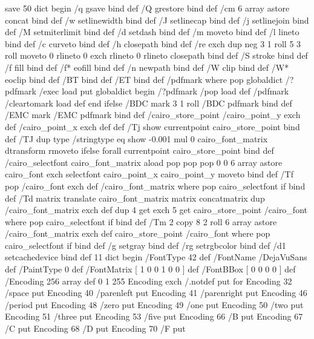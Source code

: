 save
50 dict begin
/q { gsave } bind def
/Q { grestore } bind def
/cm { 6 array astore concat } bind def
/w { setlinewidth } bind def
/J { setlinecap } bind def
/j { setlinejoin } bind def
/M { setmiterlimit } bind def
/d { setdash } bind def
/m { moveto } bind def
/l { lineto } bind def
/c { curveto } bind def
/h { closepath } bind def
/re { exch dup neg 3 1 roll 5 3 roll moveto 0 rlineto
      0 exch rlineto 0 rlineto closepath } bind def
/S { stroke } bind def
/f { fill } bind def
/f* { eofill } bind def
/n { newpath } bind def
/W { clip } bind def
/W* { eoclip } bind def
/BT { } bind def
/ET { } bind def
/pdfmark where { pop globaldict /?pdfmark /exec load put }
    { globaldict begin /?pdfmark /pop load def /pdfmark
    /cleartomark load def end } ifelse
/BDC { mark 3 1 roll /BDC pdfmark } bind def
/EMC { mark /EMC pdfmark } bind def
/cairo_store_point { /cairo_point_y exch def /cairo_point_x exch def } def
/Tj { show currentpoint cairo_store_point } bind def
/TJ {
  {
    dup
    type /stringtype eq
    { show } { -0.001 mul 0 cairo_font_matrix dtransform rmoveto } ifelse
  } forall
  currentpoint cairo_store_point
} bind def
/cairo_selectfont { cairo_font_matrix aload pop pop pop 0 0 6 array astore
    cairo_font exch selectfont cairo_point_x cairo_point_y moveto } bind def
/Tf { pop /cairo_font exch def /cairo_font_matrix where
      { pop cairo_selectfont } if } bind def
/Td { matrix translate cairo_font_matrix matrix concatmatrix dup
      /cairo_font_matrix exch def dup 4 get exch 5 get cairo_store_point
      /cairo_font where { pop cairo_selectfont } if } bind def
/Tm { 2 copy 8 2 roll 6 array astore /cairo_font_matrix exch def
      cairo_store_point /cairo_font where { pop cairo_selectfont } if } bind def
/g { setgray } bind def
/rg { setrgbcolor } bind def
/d1 { setcachedevice } bind def
11 dict begin
/FontType 42 def
/FontName /DejaVuSans def
/PaintType 0 def
/FontMatrix [ 1 0 0 1 0 0 ] def
/FontBBox [ 0 0 0 0 ] def
/Encoding 256 array def
0 1 255 { Encoding exch /.notdef put } for
Encoding 32 /space put
Encoding 40 /parenleft put
Encoding 41 /parenright put
Encoding 46 /period put
Encoding 48 /zero put
Encoding 49 /one put
Encoding 50 /two put
Encoding 51 /three put
Encoding 53 /five put
Encoding 66 /B put
Encoding 67 /C put
Encoding 68 /D put
Encoding 70 /F put
